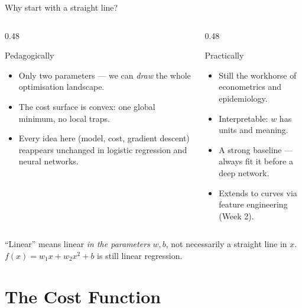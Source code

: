 \documentclass[aspectratio=169,10pt]{beamer}
\begin{document}
\begin{frame}{Why start with a straight line?}
  \small
  \begin{columns}[T,onlytextwidth]
    \begin{column}{0.48\textwidth}
      \begin{block}{Pedagogically}
        \begin{itemize}
          \item Only two parameters --- we can \emph{draw} the whole optimisation landscape.
          \item The cost surface is convex: one global minimum, no local traps.
          \item Every idea here (model, cost, gradient descent) reappears unchanged in
                logistic regression and neural networks.
        \end{itemize}
      \end{block}
    \end{column}
    \begin{column}{0.48\textwidth}
      \begin{block}{Practically}
        \begin{itemize}
          \item Still the workhorse of econometrics and epidemiology.
          \item Interpretable: $w$ has units and meaning.
          \item A strong baseline --- always fit it before a deep network.
          \item Extends to curves via feature engineering (Week 2).
        \end{itemize}
      \end{block}
    \end{column}
  \end{columns}
  \vspace{2mm}
  \begin{keyidea}
    ``Linear'' means linear \emph{in the parameters} $w,b$, not necessarily a
    straight line in $x$. $f(x)=w_1x+w_2x^2+b$ is still linear regression.
  \end{keyidea}
\end{frame}

\section{The Cost Function}
\end{document}
